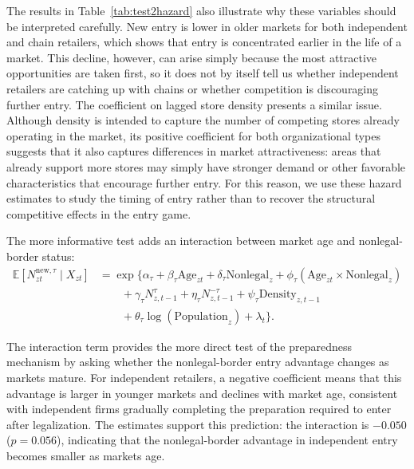 \documentclass[english,12pt]{article}
\begin{document}
The results in Table~\ref{tab:test2hazard} also illustrate why these variables should be interpreted carefully. New entry is lower in older markets for both independent and chain retailers, which shows that entry is concentrated earlier in the life of a market. This decline, however, can arise simply because the most attractive opportunities are taken first, so it does not by itself tell us whether independent retailers are catching up with chains or whether competition is discouraging further entry. The coefficient on lagged store density presents a similar issue. Although density is intended to capture the number of competing stores already operating in the market, its positive coefficient for both organizational types suggests that it also captures differences in market attractiveness: areas that already support more stores may simply have stronger demand or other favorable characteristics that encourage further entry. For this reason, we use these hazard estimates to study the timing of entry rather than to recover the structural competitive effects in the entry game.

The more informative test adds an interaction between market age and nonlegal-border status:
\begin{equation}
\label{eq:hazard_interaction}
\begin{aligned}
\mathbb{E}\!\left[
N^{\mathrm{new},\tau}_{zt}\mid X_{zt}
\right]
&=
\exp\Bigg\{
\alpha_\tau
+ \beta_\tau \mathrm{Age}_{zt}
+ \delta_\tau \mathrm{Nonlegal}_z
+ \phi_\tau
\left(
\mathrm{Age}_{zt}\times\mathrm{Nonlegal}_z
\right) \\
&\qquad
+ \gamma_\tau N^{\tau}_{z,t-1}
+ \eta_\tau N^{-\tau}_{z,t-1}
+ \psi_\tau \mathrm{Density}_{z,t-1} \\
&\qquad
+ \theta_\tau \log(\mathrm{Population}_z)
+ \lambda_t
\Bigg\}.
\end{aligned}
\end{equation}

The interaction term provides the more direct test of the preparedness mechanism by asking whether the nonlegal-border entry advantage changes as markets mature. For independent retailers, a negative coefficient means that this advantage is larger in younger markets and declines with market age, consistent with independent firms gradually completing the preparation required to enter after legalization. The estimates support this prediction: the interaction is $-0.050$ ($p=0.056$), indicating that the nonlegal-border advantage in independent entry becomes smaller as markets age.
\end{document}
